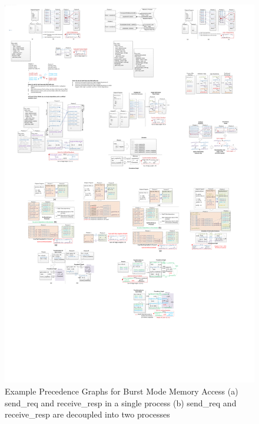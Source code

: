 \begin{figure}[htp]
\begin{center}
\includegraphics[width=0.95\linewidth]{chap4fig/burstDependence2.pdf}
\caption{Example Precedence Graphs for Burst Mode Memory Access (a) send\_req and receive\_resp in a single process (b) send\_req and receive\_resp are decoupled into two processes
\label{fig:burstDep}}
\end{center}
\end{figure}

